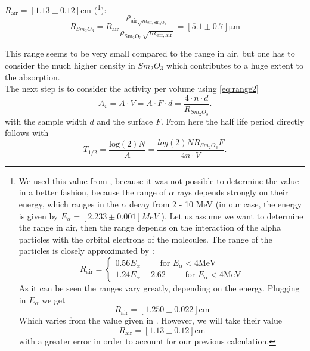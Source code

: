 $R_{\mathrm{air}} = [1.13\pm0.12]$cm (\footnote{%
We used this value from \cite{ver}, because it was not possible to determine the value in a better
fashion, because the range of $\alpha$ rays depends strongly on their energy, which ranges in the $\alpha$ decay
from 2 - 10 MeV \cite{konya2012nuclear} (in our case, the energy is given by $E_\alpha = [2.233 \pm 0.001]MeV$
\cite{staatsexamen}).
Let us assume
we want to determine the range in air, then the range depends on the interaction of the alpha particles with
the orbital electrons of the molecules. The range of the particles is closely approximated
by \cite{cember1996introduction}:
\begin{equation}
R_{\mathrm{air}} =
\begin{cases}
0.56 E_\alpha \qquad \text{ for } E_\alpha < 4 \mathrm{MeV} \\
1.24 E_\alpha - 2.62 \qquad \text{ for } E_\alpha < 4 \mathrm{MeV} 
\end{cases}
\end{equation}
As it can be seen the ranges vary greatly, depending on the energy. Plugging in $E_\alpha$ we get
\begin{equation}
R_{\mathrm{air}} = [1.250\pm0.022] \mathrm{cm}
\end{equation}
Which varies from the value given in \cite{staatsexamen}. However, we
will take their value
\begin{equation}
R_{\mathrm{air}} = [1.13\pm0.12] \mathrm{cm}
\end{equation}
with a greater error in order to account for our previous calculation.
}):
\begin{equation}
    R_{Sm_2O_3} =R_{\mathrm{air}} \frac{\rho_{\mathrm{air}\sqrt{m_{\mathrm{eff,Sm_2O_3}}}}}
    {\rho_{\mathrm{Sm_2O_3}} \sqrt{m_{\mathrm{eff,air}}} } 
    = [5.1 \pm 0.7] \mathrm{\mu m}
\end{equation}





This range seems to be very small compared to the range in air, but one has to consider the much higher density
in $Sm_2O_3$ which contributes to a huge extent to the absorption. \\
The next step is to consider the activity per volume using \eqref{eq:range2}
\begin{equation}
A_v = A \cdot V = A \cdot F \cdot d = \frac{4\cdot n \cdot d}{R_{Sm_2O_3} }.
\end{equation}
with the sample width $d$ and the surface $F$. From here the half life period directly follows with
\begin{equation}
T_{1/2} = \frac{\mathrm{log}(2)N}{A} = \frac{log(2) N R_{Sm_2O_3}F}{4 n \cdot V}.
\label{eq:T12_sam}
\end{equation}

